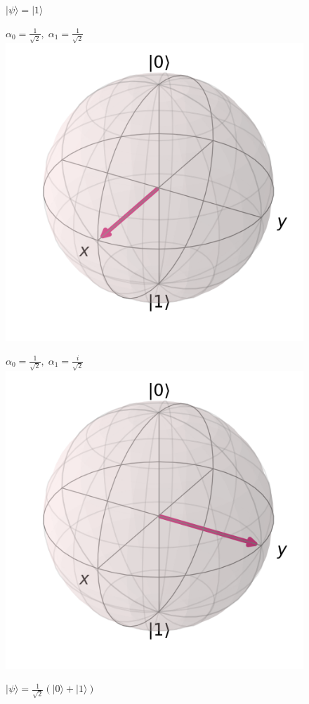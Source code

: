 \documentclass[english]{article}
\begin{document}
\begin{enumerate}
\begin{figure}[h]
\begin{minipage}{0.4\textwidth}
							\caption{$|\psi\rangle= |1\rangle$}
						\end{minipage}
					\end{figure}
					\begin{figure}[h]
						\begin{minipage}{0.4\textwidth}
							\item $\alpha_0=\frac{1}{\sqrt{2}}, \;\alpha_1=\frac{1}{\sqrt{2}}$
							\includegraphics[scale=0.4]{xket.png}
							\caption{$|\psi\rangle = \frac{1}{\sqrt{2}}(|0\rangle+|1\rangle)$}
						\end{minipage} \hfill
						\begin{minipage}{0.4\textwidth}
							\item $\alpha_0=\frac{1}{\sqrt{2}}, \;\alpha_1=\frac{i}{\sqrt{2}}$
							\includegraphics[scale=0.4]{yket.png}

\end{minipage}
\end{figure}
\end{enumerate}
\end{document}
